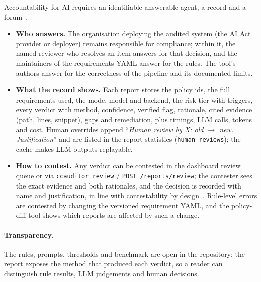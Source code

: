 Accountability for AI requires an identifiable answerable agent, a record and a forum~\cite{novelli2023accountability}.
\begin{itemize}[leftmargin=*]
  \item \textbf{Who answers.} The organisation deploying the audited system (the AI Act provider or deployer) remains
        responsible for compliance; within it, the named reviewer who resolves an item answers for that decision, and the
        maintainers of the requirements YAML answer for the rules. The tool's authors answer for the correctness of the
        pipeline and its documented limits.
  \item \textbf{What the record shows.} Each report stores the policy ids, the full requirements used, the mode,
        model and backend, the risk tier with triggers, every verdict with method, confidence, verified flag, rationale,
        cited evidence (path, lines, snippet), gaps and remediation, plus timings, LLM calls, tokens and cost. Human
        overrides append ``\emph{Human review by X: old $\to$ new. Justification}'' and are listed in the report statistics (\texttt{human\_reviews});
        the cache makes LLM outputs replayable.
  \item \textbf{How to contest.} Any verdict can be contested in the dashboard review queue or via
        \texttt{ccauditor review} / \texttt{POST /reports/review}; the contester sees the exact evidence and both
        rationales, and the decision is recorded with name and justification, in line with contestability by
        design~\cite{alfrink2022contestable}. Rule-level errors are contested by changing the versioned requirement YAML,
        and the policy-diff tool shows which reports are affected by such a change.
\end{itemize}

\paragraph{Transparency.} The rules, prompts, thresholds and benchmark are open in the repository; the report exposes the
method that produced each verdict, so a reader can distinguish rule results, LLM judgements and human decisions.
